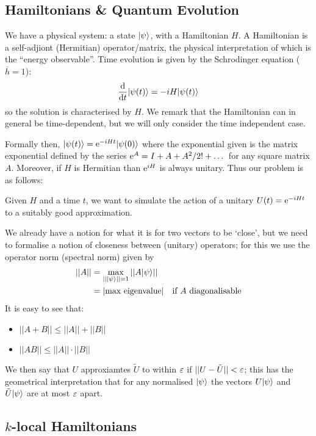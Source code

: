 \documentclass[]{article}
\renewcommand{\bar}{\overline}
\begin{document}
\subsection*{Hamiltonians \& Quantum Evolution}

We have a physical system: a state $\lvert\psi\rangle$, with a Hamiltonian $H$. A Hamiltonian is a self-adjiont (Hermitian) operator/matrix, the physical interpretation of which is the ``energy observable''. Time evolution is given by the Schrodinger equation ($\bar{h} = 1$):
\begin{align*}
	\frac{\textrm{d}}{\textrm{d}t}\lvert\psi(t)\rangle = -iH\lvert\psi(t)\rangle
\end{align*}
so the solution is characterised by $H$. We remark that the Hamiltonian can in general be time-dependent, but we will only consider the time independent case.

Formally then, $\lvert\psi(t)\rangle = \mathrm{e}^{-iHt}\lvert\psi(0)\rangle$ where the exponential given is the matrix exponential defined by the series $\mathrm{e}^A = I + A + A^2/2! +\dots$ for any square matrix $A$. Moreover, if $H$ is Hermitian than $\mathrm{e}^{iH}$ is always unitary. Thus our problem is as follows:

Given $H$ and a time $t$, we want to simulate the action of a unitary $U(t) = \mathrm{e}^{-iHt}$ to a suitably good approximation.

We already have a notion for what it is for two vectors to be `close', but we need to formalise a notion of closeness between (unitary) operators; for this we use the operator norm (spectral norm) given by
\begin{align*}
	||A|| &= \max_{||\lvert\psi\rangle||=1}||A\lvert\psi\rangle||\\
	&= |\textrm{max eigenvalue}|\quad\textrm{if $A$ diagonalisable}
\end{align*}
It is easy to see that:
\begin{itemize}
	\item $||A+B|| \le ||A|| + ||B||$
	\item $||AB|| \le ||A||\cdot||B||$
\end{itemize}

We then say that $U$ approxiamtes $\tilde{U}$ to within $\varepsilon$ if $||U - \tilde{U}|| < \varepsilon$; this has the geometrical interpretation that for any normalised $\lvert\psi\rangle$ the vectors $U\lvert\psi\rangle$ and $\tilde{U}\lvert\psi\rangle$ are at most $\varepsilon$ apart.

\subsection*{$k$-local Hamiltonians}
\end{document}
